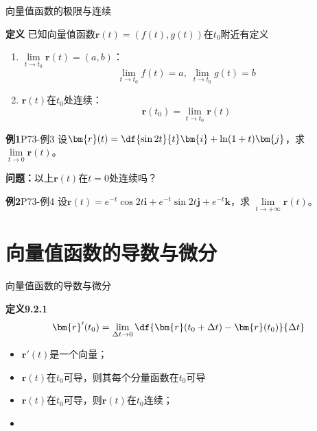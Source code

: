 \begin{frame}{向量值函数的极限与连续}
	\linespread{1.2}\pause 
	\begin{block}{{\bf 定义}\hfill}
		已知向量值函数$\bm{r}(t)=(f(t),g(t))$在$t_0$附近有定义\pause 
		\begin{enumerate}
		  \item {\bb $\lim\limits_{t\to t_0}\bm{r}(t)=(a,b)$：}
		  $$\lim\limits_{t\to t_0}f(t)=a,\;\lim\limits_{t\to t_0}g(t)=b$$
		  \pause\vspace{-1em} 
		  \item {\bb $\bm{r}(t)$在$t_0$处连续：}
		  $$\bm{r}(t_0)=\lim\limits_{t\to t_0}\bm{r}(t)$$
		\end{enumerate}
	\end{block}
\end{frame}

\begin{frame}
	\linespread{1.2}
	\begin{exampleblock}{{\bf 例1}\hfill P73-例3}
		设$\bm{r}(t)=\df{\sin 2t}{t}\bm{i}+\ln(1+t)\bm{j}$，求
		$\lim\limits_{t\to 0}\bm{r}(t)$。
	\end{exampleblock}\pause 
	{\bf 问题：}以上$\bm{r}(t)$在$t=0$处连续吗？\pause
	\bigskip
	\begin{exampleblock}{{\bf 例2}\hfill P73-例4}
		设$\bm{r}(t)=e^{-t}\cos 2t\bm{i}+e^{-t}\sin 2t\bm{j}+e^{-t}\bm{k}$，求
		$\lim\limits_{t\to +\infty}\bm{r}(t)$。
	\end{exampleblock}
\end{frame}

\section{向量值函数的导数与微分}

\begin{frame}{向量值函数的导数与微分}
	\linespread{1.2}\pause 
	\begin{block}{{\bf 定义9.2.1}\hfill}
		$$\bm{r}'(t_0)=\lim\limits_{\Delta t\to 0}
		\df{\bm{r}(t_0+\Delta t)-\bm{r}(t_0)}{\Delta t}$$
	\end{block}\pause 
	\begin{itemize}
	  \item {$\bm{r}'(t)$是一个向量；}\pause 
	  \item $\bm{r}(t)$在$t_0$可导，则其每个分量函数在$t_0$可导\pause
	  \item {$\bm{r}(t)$在$t_0$可导，则$\bm{r}(t)$在$t_0$连续；}\pause 
	  \item {}
	\end{itemize}
\end{frame}

